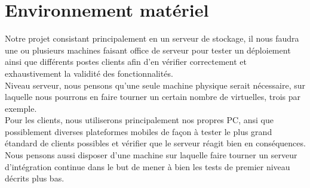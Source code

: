 \section{Environnement matériel}
Notre projet consistant principalement en un serveur de stockage, il nous faudra une ou plusieurs machines faisant office de serveur pour tester un déploiement ainsi que différents postes clients afin d'en vérifier correctement et exhaustivement la validité des fonctionnalités.\\

Niveau serveur, nous pensons qu'une seule machine physique serait nécessaire, sur laquelle nous pourrons en faire tourner un certain nombre de virtuelles, trois par exemple.\\

Pour les clients, nous utiliserons principalement nos propres PC, ansi que possiblement diverses plateformes mobiles de façon à tester le plus grand étandard de clients possibles et vérifier que le serveur réagit bien en conséquences.\\

Nous pensons aussi disposer d'une machine sur laquelle faire tourner un serveur d'intégration continue dans le but de mener à bien les tests de premier niveau décrits plus bas.
